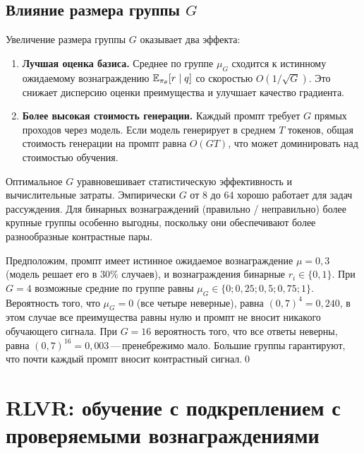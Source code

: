 \subsection{Влияние размера группы $G$}

Увеличение размера группы $G$ оказывает два эффекта:
\begin{enumerate}[leftmargin=*]
  \item \textbf{Лучшая оценка базиса.} Среднее по группе $\mu_G$ сходится к истинному ожидаемому вознаграждению $\operatorname{\mathbb{E}}_{\pi_\theta}[r \mid q]$ со скоростью $O(1/\sqrt{G})$. Это снижает дисперсию оценки преимущества и улучшает качество градиента.
  \item \textbf{Более высокая стоимость генерации.} Каждый промпт требует $G$ прямых проходов через модель. Если модель генерирует в среднем $T$ токенов, общая стоимость генерации на промпт равна $O(GT)$, что может доминировать над стоимостью обучения.
\end{enumerate}
Оптимальное $G$ уравновешивает статистическую эффективность и вычислительные затраты. Эмпирически $G$ от 8 до 64 хорошо работает для задач рассуждения. Для бинарных вознаграждений (правильно / неправильно) более крупные группы особенно выгодны, поскольку они обеспечивают более разнообразные контрастные пары.

\begin{example}
\label{ex:grpo-group-size}
Предположим, промпт имеет истинное ожидаемое вознаграждение $\mu = 0{,}3$ (модель решает его в 30\% случаев), и вознаграждения бинарные $r_i \in \{0, 1\}$. При $G = 4$ возможные средние по группе равны $\mu_G \in \{0; 0{,}25; 0{,}5; 0{,}75; 1\}$. Вероятность того, что $\mu_G = 0$ (все четыре неверные), равна $(0{,}7)^4 = 0{,}240$, в этом случае все преимущества равны нулю и промпт не вносит никакого обучающего сигнала. При $G = 16$ вероятность того, что все ответы неверны, равна $(0{,}7)^{16} = 0{,}003$\,---\,пренебрежимо мало. Большие группы гарантируют, что почти каждый промпт вносит контрастный сигнал.\qed
\end{example}

\section{RLVR: обучение с подкреплением с проверяемыми вознаграждениями}
\label{sec:rlvr}


